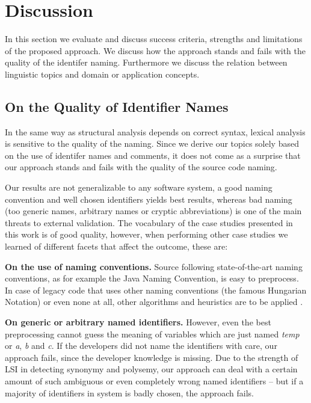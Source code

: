 \section{Discussion}\label{sec:discussion}


In this section we evaluate and discuss success criteria, strengths and limitations of the proposed approach. We discuss how the approach stands and fails with the quality of the identifer naming. Furthermore we discuss the relation between linguistic topics and domain or application concepts.

\subsection{On the Quality of Identifier Names}

In the same way as structural analysis depends on correct syntax, lexical analysis is sensitive to the quality of the naming. Since we derive our topics solely based on the use of identifer names and comments, it does not come as a surprise that our approach stands and fails with the quality of the source code naming.

Our results are not generalizable to any software system, a good naming convention and well chosen identifiers yields best results, whereas bad naming (\ie too generic names, arbitrary names or cryptic abbreviations) is one of the main threats to external validation. The vocabulary of the case studies presented in this work is of good quality, however, when performing other case studies we learned of different facets that affect the outcome, these are:

\textbf{On the use of naming conventions.} Source following state-of-the-art naming conventions, as for example the Java Naming Convention, is easy to preprocess. In case of legacy code that uses other naming conventions (\eg the famous Hungarian Notation) or even none at all, other algorithms and heuristics are to be applied \cite{Capr93a,Anqu98b}.

\textbf{On generic or arbitrary named identifiers.} However, even the best preprocessing cannot guess the meaning of variables which are just named \emph{temp} or \emph{a}, \emph{b} and \emph{c}. If the developers did not name the identifiers with care, our approach fails, since the developer knowledge is missing. Due to the strength of LSI in detecting synonymy and polysemy, our approach can deal with a certain amount of such ambiguous or even completely wrong named identifiers -- but if a majority of identifiers in system is badly chosen, the approach fails.

